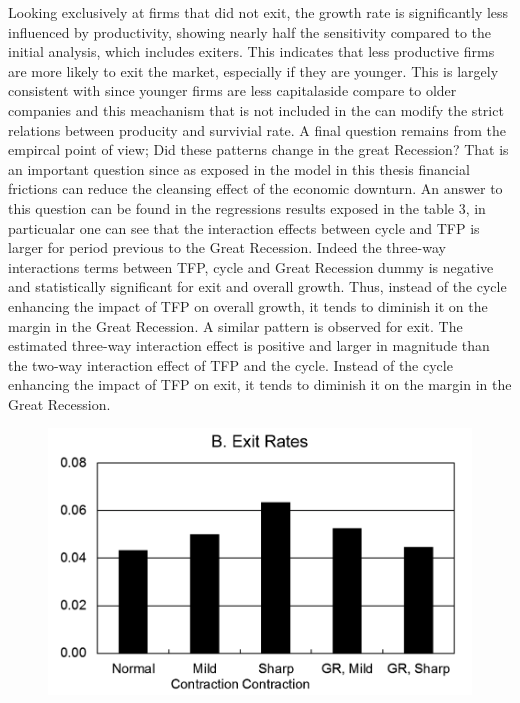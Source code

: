 \documentclass[12pt]{article}
\begin{document}
Looking exclusively at firms that did not exit, the growth rate is significantly less influenced by productivity,
showing nearly half the sensitivity compared to the initial analysis, which includes exiters. This indicates that less
productive firms are more likely to exit the market, especially if they are younger. 
This is largely consistent with \cite{OsePap17} since younger firms are less capitalaside compare to older companies and
this meachanism that is not included in the \cite{CabHarm94} can modify the strict relations between producity and
survivial rate. 
A final question remains from the empircal point of view; 
Did these patterns change in the great Recession?
That is an important question since as exposed in the model in this thesis financial frictions can reduce the cleansing
effect of the economic downturn. 
An answer to this question can be found in the regressions results exposed in the table 3, in particualar one can see
that the interaction effects between cycle and TFP is larger for period previous to the Great Recession. Indeed the
three-way interactions terms between TFP, cycle and Great Recession dummy is negative and statistically significant for
exit and overall growth. Thus, instead of the cycle enhancing the impact of TFP
on overall growth, it tends to diminish it on the margin in the Great
Recession. A similar pattern is observed for exit. The estimated three-way
interaction effect is positive and larger in magnitude than the two-way
interaction effect of TFP and the cycle. Instead of the cycle enhancing the
impact of TFP on exit, it tends to diminish it on the margin in the Great
Recession.
\begin{figure}
    \centering
    \includegraphics[scale = 0.35]{Plot1.6.png}
    \label{plot:1.6}
\end{figure} 
\end{document}
